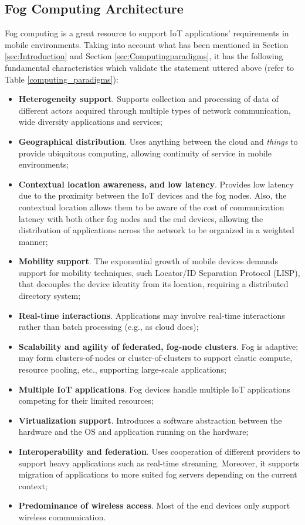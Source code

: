 \subsection{Fog Computing Architecture}
\label{sec:fog_architecture}
\noindent Fog computing is a great resource to support IoT applications' requirements in mobile environments. Taking into account what has been mentioned in Section \ref{sec:Introduction} and Section \ref{sec:Computingparadigms}, it has the following fundamental characteristics which validate the statement uttered above (refer to Table \ref{computing_paradigms}):
\begin{itemize}
	\item \textbf{Heterogeneity support}. Supports collection and processing of data of different actors acquired through multiple types of network communication, wide diversity applications and services;
	\item \textbf{Geographical distribution}. Uses anything between the cloud and \textit{things} to provide ubiquitous computing, allowing continuity of service in mobile environments;
	\item \textbf{Contextual location awareness, and low latency}. Provides low latency due to the proximity between the IoT devices and the fog nodes. Also, the contextual location allows them to be aware of the cost of communication latency with both other fog nodes and the end devices, allowing the distribution of applications across the network to be organized in a weighted manner;
	\item \textbf{Mobility support}. The exponential growth of mobile devices demands support for mobility techniques, such Locator/ID Separation Protocol (LISP), that decouples the device identity from its location, requiring a distributed directory system;
	\item \textbf{Real-time interactions}. Applications may involve real-time interactions rather than batch processing (e.g., as cloud does);
	\item \textbf{Scalability and agility of federated, fog-node clusters}. Fog is adaptive; may form clusters-of-nodes or cluster-of-clusters to support elastic compute, resource pooling, etc., supporting large-scale applications;
	\item \textbf{Multiple IoT applications}. Fog devices handle multiple IoT applications competing for their limited resources;
	\item \textbf{Virtualization support}. Introduces a software abstraction between the hardware and the OS and application running on the hardware;
	\item \textbf{Interoperability and federation}. Uses cooperation of different providers to support heavy applications such as real-time streaming. Moreover, it supports migration of applications to more suited fog servers depending on the current context;
	\item \textbf{Predominance of wireless access}. Most of the end devices only support wireless communication.
\end{itemize}

